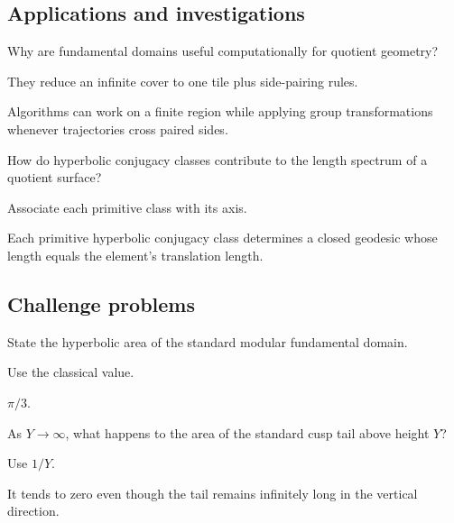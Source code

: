 \subsection*{Applications and investigations}

\begin{exercise}\label{exr:vii35-ped-13}
Why are fundamental domains useful computationally for quotient geometry?
\end{exercise}

\begin{hint}
They reduce an infinite cover to one tile plus side-pairing rules.
\end{hint}

\begin{solution}
Algorithms can work on a finite region while applying group transformations whenever trajectories cross paired sides.
\end{solution}

\begin{exercise}\label{exr:vii35-ped-14}
How do hyperbolic conjugacy classes contribute to the length spectrum of a quotient surface?
\end{exercise}

\begin{hint}
Associate each primitive class with its axis.
\end{hint}

\begin{solution}
Each primitive hyperbolic conjugacy class determines a closed geodesic whose length equals the element's translation length.
\end{solution}

\subsection*{Challenge problems}

\begin{exercise}\label{exr:vii35-ped-15}
State the hyperbolic area of the standard modular fundamental domain.
\end{exercise}

\begin{hint}
Use the classical value.
\end{hint}

\begin{solution}
\(\pi/3\).
\end{solution}

\begin{exercise}\label{exr:vii35-ped-16}
As \(Y\to\infty\), what happens to the area of the standard cusp tail above height \(Y\)?
\end{exercise}

\begin{hint}
Use \(1/Y\).
\end{hint}

\begin{solution}
It tends to zero even though the tail remains infinitely long in the vertical direction.
\end{solution}

